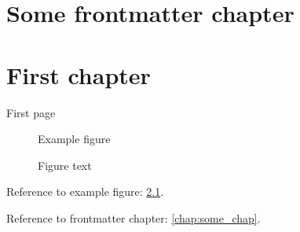 \documentclass[noprint]{uit-thesis-test}
\begin{document}
\frontmatter

\chapter{Some frontmatter chapter}\label{chap:some_chap}

\tableofcontents

\mainmatter

\chapter{First chapter}

First page

\begin{figure}[h]
\centering
Example figure
\caption{Figure text}\label{fig:example}
\end{figure}

\newpage

Reference to example figure: \ref{fig:example}.

Reference to frontmatter chapter: \autoref{chap:some_chap}.
\end{document}
